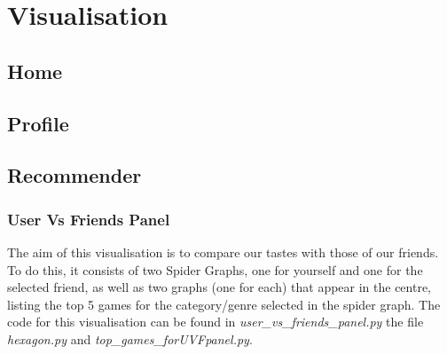 \documentclass{article}
\begin{document}
	\newpage
	
	\section{Visualisation}
	\subsection{Home}

	\subsection{Profile}

	\subsection{Recommender}
	\subsubsection{User Vs Friends Panel}
	The aim of this visualisation is to compare our tastes with those of our friends. To do this, it consists of two Spider Graphs, one for yourself and one for the selected friend, as well as two graphs (one for each) that appear in the centre, listing the top 5 games for the category/genre selected in the spider graph. The code for this visualisation can be found in \textit{user\_vs\_friends\_panel.py} the file \textit{hexagon.py} and \textit{top\_games\_forUVFpanel.py}.
\end{document}
